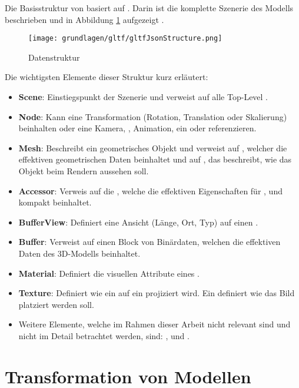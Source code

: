 Die Basisstruktur von  basiert auf . Darin ist die komplette Szenerie des Modells beschrieben und in Abbildung \ref{fig:gltfDatastructure} aufgezeigt \cite{gltfTutorialStructure}.
\begin{figure}[H]
  \centering
  \texttt{[image: grundlagen/gltf/gltfJsonStructure.png]}
  \caption{ Datenstruktur \cite{gltfTutorialStructure}}
  \label{fig:gltfDatastructure}
\end{figure}

Die wichtigsten Elemente dieser Struktur kurz erläutert:
\begin{itemize}
  \item \textbf{Scene}: Einstiegspunkt der Szenerie und verweist auf alle Top-Level .
  \item \textbf{Node}: Kann eine Transformation (Rotation, Translation oder Skalierung) beinhalten oder eine Kamera, , Animation, ein  oder  referenzieren.
  \item  \textbf{Mesh}: Beschreibt ein geometrisches Objekt und verweist auf , welcher die effektiven geometrischen Daten beinhaltet und auf , das beschreibt, wie das Objekt beim Rendern aussehen soll.
  \item \textbf{Accessor}: Verweis auf die , welche die effektiven Eigenschaften für ,  und  kompakt beinhaltet.
  \item \textbf{BufferView}: Definiert eine Ansicht (Länge, Ort, Typ) auf einen .
  \item \textbf{Buffer}: Verweist auf einen Block von Binärdaten, welchen die effektiven Daten des 3D-Modells beinhaltet.
  \item \textbf{Material}: Definiert die visuellen Attribute eines .
  \item \textbf{Texture}: Definiert wie ein  auf ein  projiziert wird. Ein  definiert wie das Bild platziert werden soll.
  \item Weitere Elemente, welche im Rahmen dieser Arbeit nicht relevant sind und nicht im Detail betrachtet werden, sind: ,  und .
\end{itemize}

\section{Transformation von Modellen}

